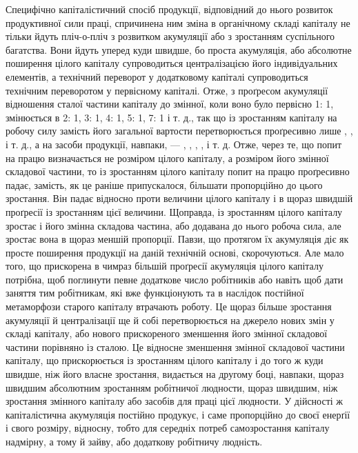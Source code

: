 Специфічно капіталістичний спосіб продукції, відповідний
до нього розвиток продуктивної сили праці, спричинена ним
зміна в органічному складі капіталу не тільки йдуть пліч-о-пліч
з розвитком акумуляції або з зростанням суспільного багатства.
Вони йдуть уперед куди швидше, бо проста акумуляція,
або абсолютне поширення цілого капіталу супроводиться централізацією
його індивідуальних елементів, а технічний переворот
у додатковому капіталі супроводиться технічним переворотом
у первісному капіталі. Отже, з проґресом акумуляції
відношення сталої частини капіталу до змінної, коли воно було
первісно 1: 1, змінюється в 2: 1, 3: 1, 4: 1, 5: 1, 7: 1 і т. д.,
так що із зростанням капіталу на робочу силу замість  його
загальної вартости перетворюється проґресивно лише , ,
   і т. д., а на засоби продукції, навпаки, — , , ,
,  і т. д. Отже, через те, що попит на працю визначається не
розміром цілого капіталу, а розміром його змінної складової
частини, то із зростанням цілого капіталу попит на працю проґресивно
падає, замість, як це раніше припускалося, більшати
пропорційно до цього зростання. Він падає відносно проти величини
цілого капіталу і в щораз швидшій проґресії із зростанням
цієї величини. Щоправда, із зростанням цілого капіталу зростає
і його змінна складова частина, або додавана до нього робоча
сила, але зростає вона в щораз меншій пропорції. Павзи, що протягом
їх акумуляція діє як просте поширення продукції на
даній технічній основі, скорочуються. Але мало того, що прискорена
в чимраз більшій проґресії акумуляція цілого капіталу
потрібна, щоб поглинути певне додаткове число робітників або
навіть щоб дати заняття тим робітникам, які вже функціонують
та в наслідок постійної метаморфози старого капіталу втрачають
роботу. Це щораз більше зростання акумуляції й централізації
ще й собі перетворюється на джерело нових змін у складі капіталу,
або нового прискореного зменшення його змінної складової
частини порівняно із сталою. Це відносне зменшення змінної
складової частини капіталу, що прискорюється із зростанням
цілого капіталу і до того ж куди швидше, ніж його власне зростання,
видається на другому боці, навпаки, щораз швидшим
абсолютним зростанням робітничої людности, щораз швидшим,
ніж зростання змінного капіталу або засобів для праці цієї людности.
У дійсності ж капіталістична акумуляція постійно продукує,
і саме пропорційно до своєї енерґії і свого розміру, відносну,
тобто для середніх потреб самозростання капіталу надмірну,
а тому й зайву, або додаткову робітничу людність.

